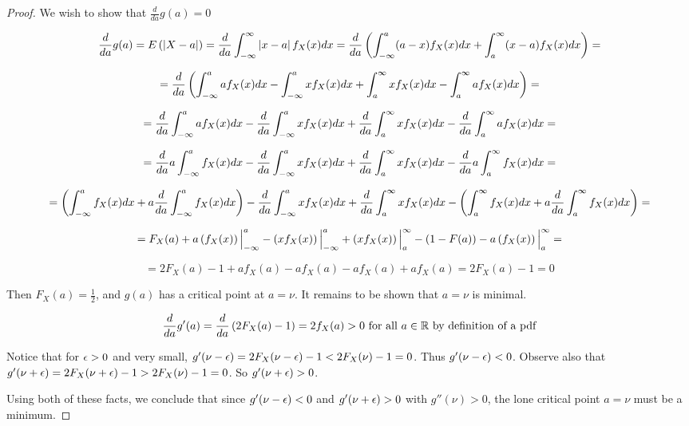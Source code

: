 \documentclass{exam}
\begin{document}
\begin{questions}
\begin{proof}
We wish to show that $\frac{d}{da}g(a) = 0$

$$\frac{d}{da} g(a) = E\left( \left| X - a \right| \right) = \frac{d}{da} \int_{-\infty}^\infty \left| x - a \right|f_X(x)dx = \frac{d}{da}\left( \int_{-\infty}^{a} (a - x)f_X(x)dx + \int_{a}^\infty (x - a)f_X(x)dx \right) =$$

$$= \frac{d}{da}\left( \int_{-\infty}^{a} af_X(x)dx - \int_{-\infty}^{a} xf_X(x)dx + \int_{a}^\infty xf_X(x)dx - \int_{a}^\infty af_X(x)dx \right) =$$

$$= \frac{d}{da}\int_{-\infty}^{a} af_X(x)dx - \frac{d}{da}\int_{-\infty}^{a} xf_X(x)dx + \frac{d}{da}\int_{a}^\infty xf_X(x)dx - \frac{d}{da}\int_{a}^\infty af_X(x)dx =$$

$$= \frac{d}{da}a\int_{-\infty}^{a} f_X(x)dx - \frac{d}{da}\int_{-\infty}^{a} xf_X(x)dx + \frac{d}{da}\int_{a}^\infty xf_X(x)dx - \frac{d}{da}a\int_{a}^\infty f_X(x)dx =$$

$$= \left( \int_{-\infty}^{a} f_X(x)dx + a\frac{d}{da}\int_{-\infty}^{a}f_X(x)dx  \right) - \frac{d}{da}\int_{-\infty}^{a} xf_X(x)dx + \frac{d}{da}\int_{a}^\infty xf_X(x)dx - \left( \int_{a}^\infty f_X(x)dx + a\frac{d}{da}\int_{a}^\infty f_X(x)dx \right) =$$

$$= F_X(a) + a\left( f_X(x) \right)\Big|_{-\infty}^a - \left( xf_X(x) \right)\Big|_{-\infty}^a + \left( xf_X(x) \right)\Big|_a^\infty - \left( 1 - F(a) \right) - a\left( f_X(x) \right)\Big|_a^\infty = $$

$$= 2F_X(a) - 1 + af_X(a) - af_X(a) - af_X(a) + af_X(a) = 2F_X(a) - 1 = 0$$

Then $F_X(a) = \frac{1}{2}$, and $g(a)$ has a critical point at $a = \nu$. It remains to be shown that $a = \nu$ is minimal.

$$\frac{d}{da} g'(a) = \frac{d}{da} \left( 2F_X(a) - 1 \right) = 2f_X(a) > 0 \text{ for all $a \in \mathbb {R}$ by definition of a pdf}$$

Notice that for $\epsilon > 0$ and very small, $g'(\nu - \epsilon) = 2F_X(\nu - \epsilon) - 1 < 2F_X(\nu) - 1 = 0$. Thus $g'(\nu - \epsilon) < 0$. Observe also that $g'(\nu + \epsilon) = 2F_X(\nu + \epsilon) - 1 > 2F_X(\nu) - 1 = 0$. So $g'(\nu + \epsilon) > 0$.
\newline

Using both of these facts, we conclude that since $g'(\nu - \epsilon) < 0$ and $g'(\nu + \epsilon) > 0$ with $g''(\nu) > 0$, the lone critical point $a = \nu$ must be a minimum.
\end{proof}
\end{questions}
\end{document}
